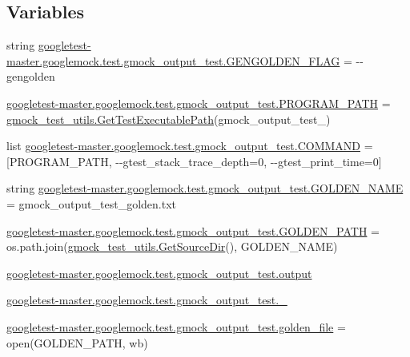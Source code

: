 \subsection*{Variables}
\begin{DoxyCompactItemize}
\item 
string \mbox{\hyperlink{namespacegoogletest-master_1_1googlemock_1_1test_1_1gmock__output__test_a0dddc38770a7d6cbf4140f820b3088da}{googletest-\/master.\+googlemock.\+test.\+gmock\+\_\+output\+\_\+test.\+G\+E\+N\+G\+O\+L\+D\+E\+N\+\_\+\+F\+L\+AG}} = \textquotesingle{}-\/-\/gengolden\textquotesingle{}
\item 
\mbox{\hyperlink{namespacegoogletest-master_1_1googlemock_1_1test_1_1gmock__output__test_adf2b7d7f05ac862e1a37218589d4c98d}{googletest-\/master.\+googlemock.\+test.\+gmock\+\_\+output\+\_\+test.\+P\+R\+O\+G\+R\+A\+M\+\_\+\+P\+A\+TH}} = \mbox{\hyperlink{namespacegmock__test__utils_aadd2927024e24f0c53f7ba283402cdb1}{gmock\+\_\+test\+\_\+utils.\+Get\+Test\+Executable\+Path}}(\textquotesingle{}gmock\+\_\+output\+\_\+test\+\_\+\textquotesingle{})
\item 
list \mbox{\hyperlink{namespacegoogletest-master_1_1googlemock_1_1test_1_1gmock__output__test_a2f45db5ccc898f94c86ff0638acbad76}{googletest-\/master.\+googlemock.\+test.\+gmock\+\_\+output\+\_\+test.\+C\+O\+M\+M\+A\+ND}} = \mbox{[}P\+R\+O\+G\+R\+A\+M\+\_\+\+P\+A\+TH, \textquotesingle{}-\/-\/gtest\+\_\+stack\+\_\+trace\+\_\+depth=0\textquotesingle{}, \textquotesingle{}-\/-\/gtest\+\_\+print\+\_\+time=0\textquotesingle{}\mbox{]}
\item 
string \mbox{\hyperlink{namespacegoogletest-master_1_1googlemock_1_1test_1_1gmock__output__test_a621cd27b2b13fd998aedb5bed214bb30}{googletest-\/master.\+googlemock.\+test.\+gmock\+\_\+output\+\_\+test.\+G\+O\+L\+D\+E\+N\+\_\+\+N\+A\+ME}} = \textquotesingle{}gmock\+\_\+output\+\_\+test\+\_\+golden.\+txt\textquotesingle{}
\item 
\mbox{\hyperlink{namespacegoogletest-master_1_1googlemock_1_1test_1_1gmock__output__test_a4e6c4bb67c4b0360311330d807512f10}{googletest-\/master.\+googlemock.\+test.\+gmock\+\_\+output\+\_\+test.\+G\+O\+L\+D\+E\+N\+\_\+\+P\+A\+TH}} = os.\+path.\+join(\mbox{\hyperlink{namespacegmock__test__utils_ab7217591e655e80392c9db6b99d04765}{gmock\+\_\+test\+\_\+utils.\+Get\+Source\+Dir}}(), G\+O\+L\+D\+E\+N\+\_\+\+N\+A\+ME)
\item 
\mbox{\hyperlink{namespacegoogletest-master_1_1googlemock_1_1test_1_1gmock__output__test_aeb6a355098823499c6b52d5410d41917}{googletest-\/master.\+googlemock.\+test.\+gmock\+\_\+output\+\_\+test.\+output}}
\item 
\mbox{\hyperlink{namespacegoogletest-master_1_1googlemock_1_1test_1_1gmock__output__test_a6b7d516e5631f8e11c1ae32adb3b0b10}{googletest-\/master.\+googlemock.\+test.\+gmock\+\_\+output\+\_\+test.\+\_\+}}
\item 
\mbox{\hyperlink{namespacegoogletest-master_1_1googlemock_1_1test_1_1gmock__output__test_a226c317fef7000ecbac0c07144333a74}{googletest-\/master.\+googlemock.\+test.\+gmock\+\_\+output\+\_\+test.\+golden\+\_\+file}} = open(G\+O\+L\+D\+E\+N\+\_\+\+P\+A\+TH, \textquotesingle{}wb\textquotesingle{})
\end{DoxyCompactItemize}
